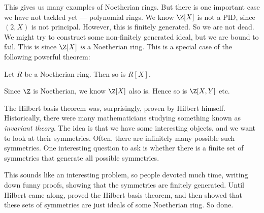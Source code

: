 \documentclass[a4paper]{article}
\begin{document}
This gives us many examples of Noetherian rings. But there is one important case we have not tackled yet --- polynomial rings. We know $\Z[X]$ is not a PID, since $(2, X)$ is not principal. However, this is finitely generated. So we are not dead. We might try to construct some non-finitely generated ideal, but we are bound to fail. This is since $\Z[X]$ \emph{is} a Noetherian ring. This is a special case of the following powerful theorem:

\begin{thm}
  Let $R$ be a Noetherian ring. Then so is $R[X]$.
\end{thm}
Since $\Z$ is Noetherian, we know $\Z[X]$ also is. Hence so is $\Z[X, Y]$ etc.

The Hilbert basis theorem was, surprisingly, proven by Hilbert himself. Historically, there were many mathematicians studying something known as \emph{invariant theory}. The idea is that we have some interesting objects, and we want to look at their symmetries. Often, there are infinitely many possible such symmetries. One interesting question to ask is whether there is a finite set of symmetries that generate all possible symmetries.

This sounds like an interesting problem, so people devoted much time, writing down funny proofs, showing that the symmetries are finitely generated. Until Hilbert came along, proved the Hilbert basis theorem, and then showed that these sets of symmetries are just ideals of some Noetherian ring. So done.
\end{document}
